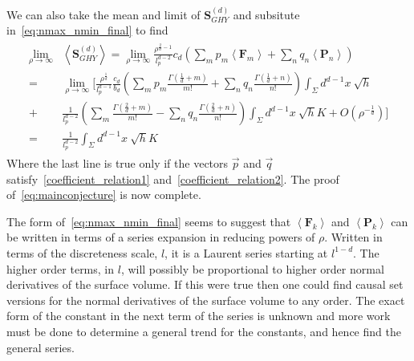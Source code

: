 \documentclass[12pt]{article}
\newcommand{\BF}[1]{\mathbf{F}_{#1}}
\newcommand{\BP}[1]{\mathbf{P}_{#1}}
\begin{document}
We can also take the mean and limit of $\textbf{S}^{ (d)}_{GHY}$ and subsitute in~\eqref{eq:nmax_nmin_final} to find
\begin{gather}\label{eq:boundary_final_proof}
\begin{aligned}
\lim_{\rho\rightarrow\infty} & \left\langle \textbf{S}^{ (d)}_{GHY}\right\rangle = \lim_{\rho\rightarrow\infty} \frac{\rho^{\frac{2}{d}-1}}{l_p^{d-2}} c_{d}\left (\sum_m p_m \left\langle\textbf{F}_m\right\rangle  + \sum_n q_n \left\langle\textbf{P}_n\right\rangle\right)
\\
= & \lim_{\rho\rightarrow\infty}\Bigg[\frac{\rho^{\frac{1}{d}}}{l_p^{d-1}}\frac{c_d}{b_d}\left(\sum_m p_m \frac{\Gamma\left (\frac{1}{d}+m \right)}{m!}  + \sum_n q_n\frac{\Gamma\left (\frac{1}{d}+n \right)}{n!} \right) \int_{\Sigma}d^{d-1}x\: \sqrt{h}
\\
+ &\frac{1}{l_p^{d-2}}\left(\sum_m\frac{\Gamma\left (\frac{2}{d}+m \right)}{m!}  - \sum_n q_n\frac{\Gamma\left (\frac{2}{d}+n \right)}{n!} \right) \int_{\Sigma}d^{d-1}x\: \sqrt{h}K + O(\rho^{-\frac{1}{d}})\Bigg]
\\
= & \frac{1}{l_p^{d-2}}\int_{\Sigma}d^{d-1}x\: \sqrt{h}K
\end{aligned}
\end{gather}
Where the last line is true only if the vectors $\vec{p}$ and $\vec{q}$ satisfy~\eqref{coefficient_relation1} and~\eqref{coefficient_relation2}. The proof of~\eqref{eq:mainconjecture} is now complete.

The form of~\eqref{eq:nmax_nmin_final} seems to suggest that $\left\langle \BF{k}\right\rangle$ and $\left\langle \BP{k}\right\rangle$ can be written in terms of a series expansion in reducing powers of $\rho$. Written in terms of the discreteness scale, $l$, it is a Laurent series starting at $l^{1-d}$. The higher order terms, in $l$, will possibly be proportional to higher order normal derivatives of the surface volume. If this were true then one could find causal set versions for the normal derivatives of the surface volume to any order. The exact form of the constant in the next term of the series is unknown and more work must be done to determine a general trend for the constants, and hence find the general series.
\end{document}
